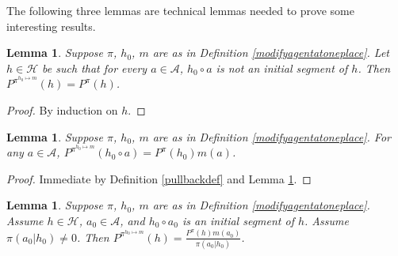 \documentclass[twoside]{article}
\newtheorem{lemma}[theorem]{Lemma}
\begin{document}
The following three lemmas are technical lemmas needed to prove
some interesting results.

\begin{lemma}
\label{firsttechlemmaforgenericity}
    Suppose $\pi$, $h_0$, $m$ are as in Definition \ref{modifyagentatoneplace}.
    Let $h\in\mathcal H$ be such that
    for every $a\in\mathcal A$,
    $h_0\circ a$ is not an initial segment of $h$.
    Then $P^{\pi^{h_0\mapsto m}}(h)=P^\pi(h)$.
\end{lemma}

\begin{proof}
    By induction on $h$.
\end{proof}

\begin{lemma}
\label{thirdtechlemmaforgenericity}
    Suppose $\pi$, $h_0$, $m$ are as in Definition \ref{modifyagentatoneplace}.
    For any $a\in\mathcal A$,
    $P^{\pi^{h_0\mapsto m}}(h_0\circ a)=P^\pi(h_0)m(a)$.
\end{lemma}

\begin{proof}
    Immediate by Definition \ref{pullbackdef} and Lemma \ref{firsttechlemmaforgenericity}.
\end{proof}

\begin{lemma}
\label{secondtechlemmaforgenericity}
    Suppose $\pi$, $h_0$, $m$ are as in Definition \ref{modifyagentatoneplace}.
    Assume $h\in\mathcal H$, $a_0\in\mathcal A$, and $h_0\circ a_0$ is
    an initial segment of $h$. Assume $\pi(a_0|h_0)\not=0$. Then
    $P^{\pi^{h_0\mapsto m}}(h) = \frac{P^\pi(h)m(a_0)}{\pi(a_0|h_0)}$.
\end{lemma}
\end{document}
